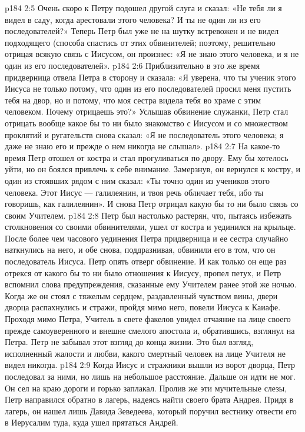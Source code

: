 \vs p184 2:5 Очень скоро к Петру подошел другой слуга и сказал: «Не тебя ли я видел в саду, когда арестовали этого человека? И ты не один ли из его последователей?» Теперь Петр был уже не на шутку встревожен и не видел подходящего (способа спастись от этих обвинителей; поэтому, решительно отрицая всякую связь с Иисусом, он произнес: «Я не знаю этого человека, и я не один из его последователей».
\vs p184 2:6 Приблизительно в это же время придверница отвела Петра в сторону и сказала: «Я уверена, что ты ученик этого Иисуса не только потому, что один из его последователей просил меня пустить тебя на двор, но и потому, что моя сестра видела тебя во храме с этим человеком. Почему отрицаешь это?» Услышав обвинение служанки, Петр стал отрицать вообще какое бы то ни было знакомство с Иисусом и со множеством проклятий и ругательств снова сказал: «Я не последователь этого человека; я даже не знаю его и прежде о нем никогда не слышал».
\vs p184 2:7 На какое\hyp{}то время Петр отошел от костра и стал прогуливаться по двору. Ему бы хотелось уйти, но он боялся привлечь к себе внимание. Замерзнув, он вернулся к костру, и один из стоявших рядом с ним сказал: «Ты точно один из учеников этого человека. Этот Иисус --- галилеянин, и твоя речь обличает тебя, ибо ты говоришь, как галилеянин». И снова Петр отрицал какую бы то ни было связь со своим Учителем.
\vs p184 2:8 Петр был настолько растерян, что, пытаясь избежать столкновения со своими обвинителями, ушел от костра и уединился на крыльце. После более чем часового уединения Петра придверница и ее сестра случайно наткнулись на него, и обе снова, поддразнивая, обвинили его в том, что он последователь Иисуса. Петр опять отверг обвинение. И как только он еще раз отрекся от какого бы то ни было отношения к Иисусу, пропел петух, и Петр вспомнил слова предупреждения, сказанные ему Учителем ранее этой же ночью. Когда же он стоял с тяжелым сердцем, раздавленный чувством вины, двери дворца распахнулись и стражи, пройдя мимо него, повели Иисуса к Каиафе. Проходя мимо Петра, Учитель в свете факелов увидел отчаяние на лице своего прежде самоуверенного и внешне смелого апостола и, обратившись, взглянул на Петра. Петр не забывал этот взгляд до конца жизни. Это был взгляд, исполненный жалости и любви, какого смертный человек на лице Учителя не видел никогда.
\vs p184 2:9 Когда Иисус и стражники вышли из ворот дворца, Петр последовал за ними, но лишь на небольшое расстояние. Дальше он идти не мог. Он сел на краю дороги и горько заплакал. Пролив же эти мучительные слезы, Петр направился обратно в лагерь, надеясь найти своего брата Андрея. Придя в лагерь, он нашел лишь Давида Зеведеева, который поручил вестнику отвести его в Иерусалим туда, куда ушел прятаться Андрей.
